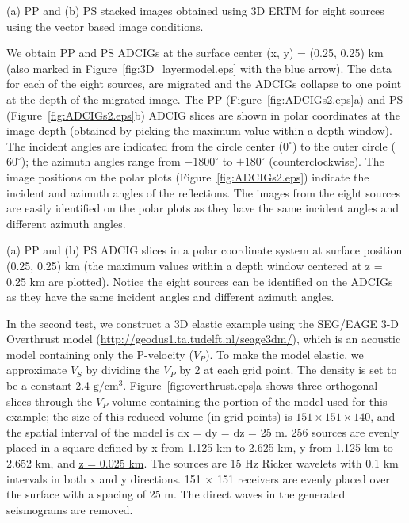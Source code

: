 \documentclass[manuscript,ulem,graphix,revised]{geophysics}
\begin{document}
{
(a) PP and (b) PS stacked images obtained using 3D ERTM for eight sources using the vector based image conditions.
}

We obtain PP and PS ADCIGs at the surface center (x, y) = (0.25, 0.25) km (also marked in Figure~\ref{fig:3D_layermodel.eps} with the blue arrow).  The data for each of the eight sources, are migrated and the ADCIGs collapse to one point at the depth of the migrated image. 
The PP (Figure~\ref{fig:ADCIGs2.eps}a) and PS (Figure~\ref{fig:ADCIGs2.eps}b) ADCIG slices are shown in polar coordinates at the image depth (obtained by picking the maximum value within a depth window). The incident angles are indicated from the circle center ($0^{\circ}$) to the outer circle ($60^{\circ}$); the azimuth angles range from $-1800^{\circ}$ to $+180^{\circ}$ (counterclockwise). The image positions on the polar plots (Figure~\ref{fig:ADCIGs2.eps}) indicate the incident and azimuth angles of the reflections. The images from the eight sources are easily identified on the polar plots as they have the same incident angles and different azimuth angles. 


{
(a) PP and (b) PS ADCIG slices in a polar coordinate system at surface position (0.25, 0.25) km (the maximum values within a depth window centered at z = 0.25 km are plotted).  Notice the eight sources can be identified on the ADCIGs as they have the same incident angles and different azimuth angles.
}

In the second test, we construct a 3D elastic example using the SEG/EAGE 3-D Overthrust model (\url{http://geodus1.ta.tudelft.nl/seage3dm/}), which is an acoustic model containing only the P-velocity ($V_{P}$). To make the model elastic, we approximate $V_{S}$ by dividing the $V_{P}$ by 2 at each grid point.  The density is set to be a constant 2.4 $\mathrm{g/cm^3}$. Figure~\ref{fig:overthrust.eps}a shows three orthogonal slices through the $V_{P}$ volume containing the portion of the model used for this example; the size of this reduced volume (in grid points) is $151\times 151 \times 140$, and the spatial interval of the model is dx = dy = dz = 25 m. 256 sources are evenly placed in a square defined by x from 1.125 km to 2.625 km, y from 1.125 km to 2.652 km, and \marginpar{[15]}\uline{z = 0.025 km}. The sources are 15 Hz Ricker wavelets with 0.1 km intervals in both x and y directions. 151 $\times$ 151 receivers are evenly placed over the surface with a spacing of 25 m. The direct waves in the generated seismograms are removed.
\end{document}
